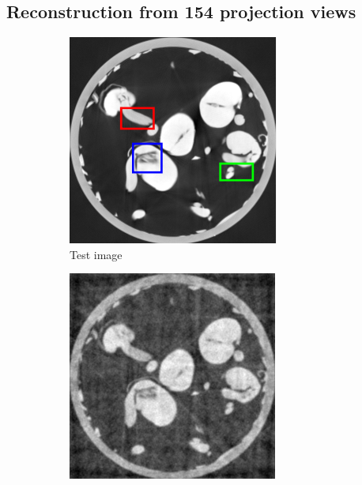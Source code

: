 \documentclass{article}
\begin{document}
\newpage
\subsection{Reconstruction from 154 projection views}
\begin{figure}[h]
    \begin{subfigure}[b]{0.3\linewidth}
        \includegraphics[width=\textwidth]{../images/supplementary/2D_sprouts/colorTestIm.png}
        \caption{Test image}
     \end{subfigure}
    \begin{subfigure}[b]{0.3\linewidth}
        \includegraphics[width=\textwidth]{../images/supplementary/2D_sprouts/154_angles/1/fbp.png}

\end{subfigure}
\end{figure}
\end{document}
